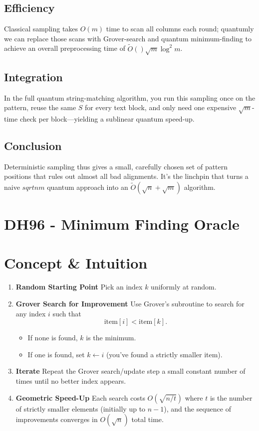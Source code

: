 \documentclass[11pt]{article}
\begin{document}
\subsection*{Efficiency}
Classical sampling takes \(O(m)\) time to scan all columns each round; quantumly we can replace those scans with Grover-search and quantum minimum-finding to achieve an overall preprocessing time of \(\widetilde{O}()\sqrt{m} \log^2 m\).

\subsection*{Integration}
In the full quantum string-matching algorithm, you run this sampling once on the pattern, reuse the same \(S\) for every text block, and only need one expensive \(\sqrt{m}\)-time check per block—yielding a sublinear quantum speed-up.

\subsection*{Conclusion}
Deterministic sampling thus gives a small, carefully chosen set of pattern positions that rules out almost all bad alignments. It's the linchpin that turns a naive \(sqrt{nm}\) quantum approach into an \(\widetilde{O}(\sqrt{n} + \sqrt{m})\) algorithm.

\section*{DH96 - Minimum Finding Oracle}
\section*{Concept \& Intuition}
\begin{enumerate}
    \item \textbf{Random Starting Point}
          Pick an index \(k\) uniformly at random.
    \item \textbf{Grover Search for Improvement}
          Use Grover's subroutine to search for any index \(i\) such that
          \[
              \text{item}[i] < \text{item}[k].
          \]
          \begin{itemize}
              \item If none is found, \(k\) is the minimum.
              \item If one is found, set \(k \leftarrow i\) (you've found a strictly smaller item).
          \end{itemize}
    \item \textbf{Iterate}
          Repeat the Grover search/update step a small constant number of times until no better index appears.
    \item \textbf{Geometric Speed-Up}
          Each search costs \(O(\sqrt{n/t})\) where \(t\) is the number of strictly smaller elements (initially up to \(n-1\)), and the sequence of improvements converges in \(O(\sqrt{n})\) total time.
\end{enumerate}
\end{document}
